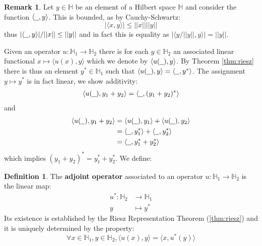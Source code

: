 \documentclass[12pt]{article}
\theoremstyle{plain}
\theoremstyle{definition}
\newtheorem{defn}[thm]{Definition} %
\newtheorem{remark}[thm]{Remark}
\newcommand{\bb}[1]{\mathbb{#1}}
\newcommand{\und}[1]{\underline{\hspace{#1 cm}}}
\newcommand{\lto}{\longrightarrow}
\begin{document}
\begin{remark}
	\label{rmk:bounded_inner_product} Let $y \in \bb{H}$ be an element of a Hilbert space $\bb{H}$ and consider the function $\langle \und{0.2},y\rangle$. This is bounded, as by Cauchy-Schwartz:
	\[|\langle x,y\rangle| \leq ||x||||y||\]
	thus $|\langle \und{0.2},y\rangle|/||x|| \leq ||y||$ and in fact this is equality as $|\langle y/||y||,y\rangle| = ||y||$.
\end{remark}
Given an operator $u: \bb{H}_1 \lto \bb{H}_2$ there is for each $y \in \bb{H}_2$ an associated linear functional $x \longmapsto \langle u(x),y\rangle$ which we denote by $\langle u(\und{0.2}),y\rangle$. By Theorem \ref{thm:riesz} there is thus an element $y^\ast \in \bb{H}_1$ such that $\langle u(\und{0.2}),y\rangle = \langle \und{0.2}, y^\ast\rangle$. The assignment $y \mapsto y^\ast$ is in fact linear, we show additivity:
\begin{align*}
	\langle u(\und{0.2}), y_1 + y_2\rangle &= \langle \und{0.2}, (y_1 + y_2)^\ast\rangle\\
\end{align*}
and
\begin{align*}
	\langle u(\und{0.2}), y_1 + y_2\rangle &= \langle u(\und{0.2}), y_1\rangle + \langle u(\und{0.2}), y_2\rangle\\
	&= \langle \und{0.2}, y_1^\ast\rangle + \langle \und{0.2}, y_2^\ast\rangle\\
	&= \langle \und{0.2}, y_1^\ast + y_2^\ast\rangle
\end{align*}
which implies $(y_1 + y_2)^\ast = y_1^\ast + y_2^\ast$. We define:
\begin{defn}
	The \textbf{adjoint operator} associated to an operator $u: \bb{H}_1 \lto \bb{H}_2$ is the linear map:
	\begin{align*}
		u^\ast: \bb{H}_2 &\lto \bb{H}_1\\
		y &\longmapsto y^\ast
	\end{align*}
	Its existence is established by the Riesz Representation Theorem (\ref{thm:riesz}) and it is uniquely determined by the property:
	\begin{equation}
		\forall x\in\bb{H}_1,y\in\bb{H}_2, \langle u(x),y\rangle = \langle x, u^\ast(y)\rangle
	\end{equation}
\end{defn}
\end{document}
